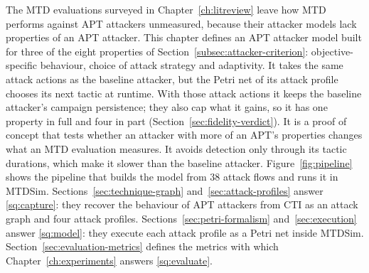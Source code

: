 \documentclass{cshonours}
\begin{document}
The MTD evaluations surveyed in Chapter~\ref{ch:litreview} leave how MTD
performs against APT attackers unmeasured, because their attacker models lack
properties of an APT attacker. %
This chapter defines an APT attacker model
built for three of the eight properties of
Section~\ref{subsec:attacker-criterion}: objective-specific behaviour, choice of attack strategy and adaptivity. It takes the same attack actions
as the baseline attacker, but the Petri net of its attack profile chooses its
next tactic at runtime. With those attack actions it keeps the baseline
attacker's campaign persistence;
they also cap what it gains, so it has one property in full and four in part
(Section~\ref{sec:fidelity-verdict}). It is a
proof of concept that tests whether an attacker with more of an APT's properties changes
what an MTD evaluation measures. It avoids detection only through its tactic durations,
which make it slower than the baseline attacker.
Figure~\ref{fig:pipeline} shows the pipeline that builds the model from 38
attack flows and runs it in MTDSim. Sections~\ref{sec:technique-graph}
and~\ref{sec:attack-profiles} answer \ref{sq:capture}: they recover the
behaviour of APT attackers from CTI as an attack graph and four attack
profiles. Sections~\ref{sec:petri-formalism} and~\ref{sec:execution} answer
\ref{sq:model}: they execute each attack profile as a Petri net inside MTDSim.
Section~\ref{sec:evaluation-metrics} defines the metrics with which
Chapter~\ref{ch:experiments} answers \ref{sq:evaluate}.
\end{document}

